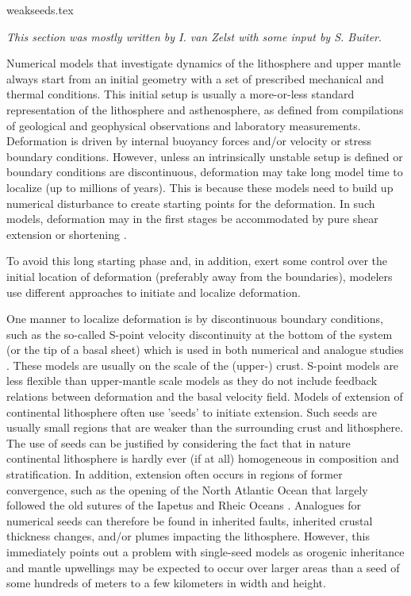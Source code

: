 \begin{flushright} {\tiny {\color{gray} weakseeds.tex}} \end{flushright}

{\sl This section was mostly written by I. van Zelst with some input by S. Buiter}. 

Numerical models that investigate dynamics of the lithosphere and upper mantle always
start from an initial geometry with a set of prescribed mechanical and thermal conditions. 
This initial setup is usually a more-or-less standard representation of the
lithosphere and asthenosphere, as defined from compilations of geological and geophysical 
observations and laboratory measurements. Deformation is driven by internal buoyancy
forces and/or velocity or stress boundary conditions. However, unless an 
intrinsically unstable setup is defined or boundary conditions are discontinuous, 
deformation may take long model time to localize (up to millions of years). 
This is because these models need to build up numerical disturbance to create starting 
points for the deformation. In such models, deformation may in the first stages be
accommodated by pure shear extension or shortening \cite{pybf00,moql07}. 

To avoid this long starting phase and, in addition, exert some control 
over the initial location of deformation (preferably away from the boundaries), modelers 
use different approaches to initiate and localize deformation.

One manner to localize deformation is by discontinuous boundary conditions, such 
as the so-called S-point velocity discontinuity at the bottom of the system 
(or the tip of a basal sheet) which is used in both numerical 
\cite{brbe95,elfb95,will99a,bemh00,bube06,thfb08,brya10}
and analogue studies \cite{bube06,mime00}.
These models are usually on the scale of the (upper-) crust. 
S-point models are less flexible than upper-mantle scale models as they do not include
feedback relations between deformation and the basal velocity field.
Models of extension of continental lithosphere often use 'seeds' to initiate
extension. Such seeds are usually small regions that are weaker than the surrounding crust
and lithosphere. The use of seeds can be justified by considering the fact that in
nature continental lithosphere is hardly ever (if at all) homogeneous in composition 
and stratification. In addition, extension often occurs in regions of former
convergence, such as the opening of the North Atlantic Ocean that largely followed the old 
sutures of the Iapetus and Rheic Oceans \cite{wils66}. Analogues for numerical seeds 
can therefore be found in inherited faults, inherited crustal thickness changes, and/or 
plumes impacting the lithosphere. However, this immediately points out a problem with 
single-seed models as orogenic inheritance and mantle upwellings may be expected to 
occur over larger areas than a seed of some hundreds of meters to a few kilometers 
in width and height.

